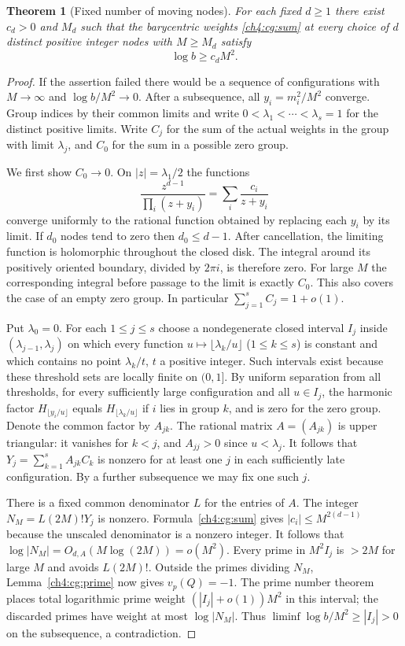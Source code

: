\documentclass[11pt,a4paper,oneside,openany]{report}
\newtheorem{theorem}{Theorem}[section]
\theoremstyle{remark}\newtheorem{remark}[theorem]{Remark}
\numberwithin{equation}{section}
\begin{document}
\begin{theorem}[Fixed number of moving nodes]\label{ch4:cg:fixed}
For each fixed $d\ge1$ there exist $c_d>0$ and $M_d$ such that the
barycentric weights \eqref{ch4:cg:sum} at \emph{every} choice of $d$
distinct positive integer nodes with $M\ge M_d$ satisfy
\[
                            \log b\ge c_d M^2 .
\]
\end{theorem}
\begin{proof}
If the assertion failed there would be a sequence of configurations
with $M\to\infty$ and $\log b/M^2\to0$. After a subsequence,
all $y_i=m_i^2/M^2$ converge. Group indices by their common limits
and write $0<\lambda_1<\cdots<\lambda_s=1$ for the distinct
positive limits. Write $C_j$ for the sum of the actual weights
in the group with limit $\lambda_j$, and $C_0$ for the sum in a
possible zero group.

We first show $C_0\to0$. On $|z|=\lambda_1/2$ the functions
\[
         \frac{z^{d-1}}{\prod_i(z+y_i)}
                     =\sum_i\frac{c_i}{z+y_i}
\]
converge uniformly to the rational function obtained by replacing
each $y_i$ by its limit. If $d_0$ nodes tend to zero then $d_0\le d-1$.
After cancellation, the limiting function is holomorphic throughout
the closed disk. The integral around its positively oriented boundary,
divided by $2\pi i$, is therefore zero. For large $M$ the corresponding
integral before passage to the limit is exactly $C_0$. This also covers
the case of an empty zero group. In particular
$\sum_{j=1}^s C_j=1+o(1)$.

Put $\lambda_0=0$. For each $1\le j\le s$ choose a nondegenerate
closed interval $I_j$ inside $(\lambda_{j-1},\lambda_j)$ on which
every function $u\mapsto\lfloor\lambda_k/u\rfloor$
($1\le k\le s$) is constant and which contains no point
$\lambda_k/t$, $t$ a positive integer. Such intervals exist because
these threshold sets are locally finite on $(0,1]$.
By uniform separation from all thresholds, for every sufficiently
large configuration and all $u\in I_j$, the harmonic factor
$H_{\lfloor y_i/u\rfloor}$ equals $H_{\lfloor\lambda_k/u\rfloor}$
if $i$ lies in group $k$, and is zero for the zero group. Denote the
common factor by $A_{jk}$. The rational matrix $A=(A_{jk})$ is upper
triangular: it vanishes for $k<j$, and $A_{jj}>0$ since $u<\lambda_j$.
It follows that $Y_j=\sum_{k=1}^s A_{jk}C_k$ is nonzero for at least
one $j$ in each sufficiently late configuration. By a further
subsequence we may fix one such $j$.

There is a fixed common denominator $L$ for the entries of $A$.
The integer $N_M=L(2M)!Y_j$ is nonzero. Formula~\eqref{ch4:cg:sum}
gives $|c_i|\le M^{2(d-1)}$ because the unscaled denominator is a
nonzero integer. It follows that
$\log|N_M|=O_{d,A}(M\log(2M))=o(M^2)$.
Every prime in $M^2I_j$ is $>2M$ for large $M$ and avoids $L(2M)!$.
Outside the primes dividing $N_M$, Lemma~\ref{ch4:cg:prime} now gives
$v_p(Q)=-1$. The prime number theorem places total logarithmic
prime weight $(|I_j|+o(1))M^2$ in this interval; the discarded
primes have weight at most $\log|N_M|$. Thus
$\liminf\log b/M^2\ge |I_j|>0$ on the subsequence, a contradiction.
\end{proof}
\end{document}
